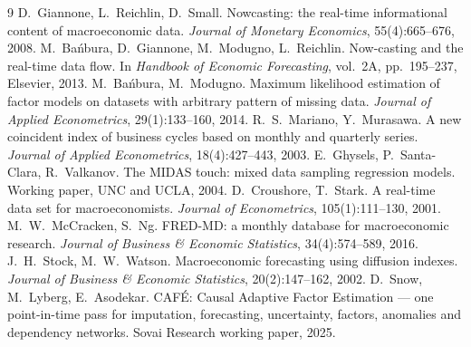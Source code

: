 \documentclass[11pt]{article}
\newcommand{\cafe}{CAF\'E}
\begin{document}
\begin{thebibliography}{9}
 D.~Giannone, L.~Reichlin, D.~Small. Nowcasting: the
real-time informational content of macroeconomic data. \emph{Journal of Monetary
Economics}, 55(4):665--676, 2008.
 M.~Ba\'nbura, D.~Giannone, M.~Modugno, L.~Reichlin.
Now-casting and the real-time data flow. In \emph{Handbook of Economic Forecasting},
vol.\ 2A, pp.\ 195--237, Elsevier, 2013.
 M.~Ba\'nbura, M.~Modugno. Maximum likelihood estimation of
factor models on datasets with arbitrary pattern of missing data. \emph{Journal of
Applied Econometrics}, 29(1):133--160, 2014.
 R.~S.~Mariano, Y.~Murasawa. A new coincident index of
business cycles based on monthly and quarterly series. \emph{Journal of Applied
Econometrics}, 18(4):427--443, 2003.
 E.~Ghysels, P.~Santa-Clara, R.~Valkanov. The MIDAS touch:
mixed data sampling regression models. Working paper, UNC and UCLA, 2004.
 D.~Croushore, T.~Stark. A real-time data set for
macroeconomists. \emph{Journal of Econometrics}, 105(1):111--130, 2001.
 M.~W.~McCracken, S.~Ng. FRED-MD: a monthly database for
macroeconomic research. \emph{Journal of Business \& Economic Statistics},
34(4):574--589, 2016.
 J.~H.~Stock, M.~W.~Watson. Macroeconomic forecasting using
diffusion indexes. \emph{Journal of Business \& Economic Statistics}, 20(2):147--162,
2002.
 D.~Snow, M.~Lyberg, E.~Asodekar. \cafe{}: Causal Adaptive Factor
Estimation --- one point-in-time pass for imputation, forecasting, uncertainty, factors,
anomalies and dependency networks. Sovai Research working paper, 2025.
\end{thebibliography}
\end{document}
